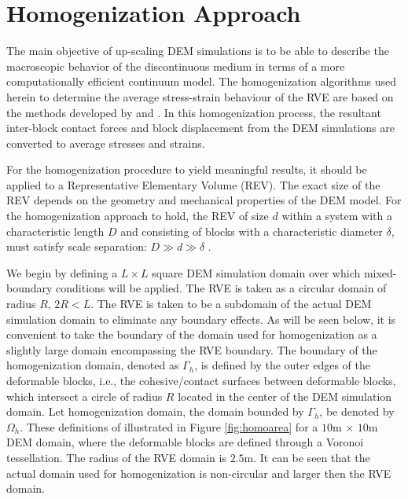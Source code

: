 \section{Homogenization Approach}

The main objective of up-scaling DEM simulations is to be able to describe the macroscopic behavior of the discontinuous medium in terms of a more computationally efficient continuum model. The homogenization algorithms used herein to determine the average stress-strain behaviour of the RVE are based on the methods developed by \citet{daddetta_particle_2004} and \citet{wellmann_homogenization_2008}. In this homogenization process, the resultant inter-block contact forces and block displacement from the DEM simulations are converted to average stresses and strains.

For the homogenization procedure to yield meaningful results, it should be applied to a Representative Elementary Volume (REV). The exact size of the REV depends on the geometry and mechanical properties of the DEM model. For the homogenization approach to hold, the REV of size $d$ within a system with a characteristic length $D$ and consisting of blocks with a characteristic diameter $\delta$, must satisfy scale separation: $D\gg d\gg\delta$ \citep{wellmann_homogenization_2008}. 

We begin by defining a $L\times L$ square DEM simulation domain over which mixed-boundary conditions will be applied. The RVE is taken as a circular domain of radius $R$, $2R<L$.  The RVE is taken to be a subdomain of the actual DEM simulation domain to eliminate any boundary effects.  As will be seen below, it is convenient to take the boundary of the domain used for homogenization as a slightly large domain encompassing the RVE boundary. The boundary of the homogenization domain, denoted as $\Gamma_h$, is defined by the outer edges of the deformable blocks, i.e., the cohesive/contact surfaces between deformable blocks, which intersect a circle of radius $R$ located in the center of the DEM simulation domain. Let homogenization domain, the domain bounded by $\Gamma_h$, be denoted by $\Omega_h$. These definitions of illustrated in Figure \ref{fig:homoarea} for a $10$m $\times$ $10$m DEM domain, where the deformable blocks are defined through a Voronoi tessellation. The radius of the RVE domain is $2.5$m.  It can be seen that the actual domain used for homogenization is non-circular and larger then the RVE domain. 


